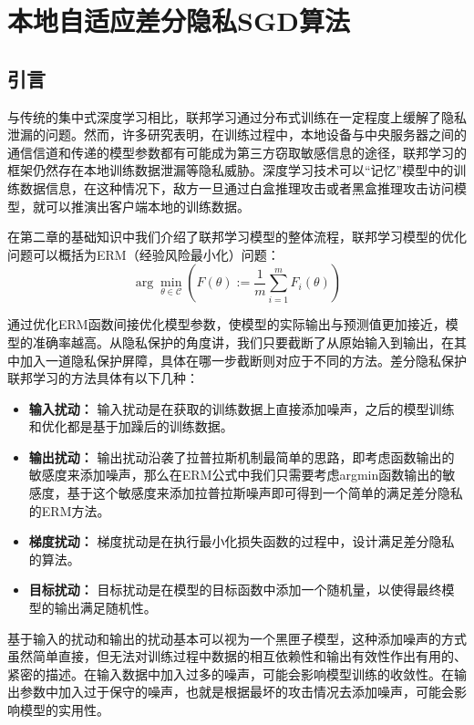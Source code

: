 \chapter{本地自适应差分隐私SGD算法}

\label{ch3}

\section{引言}
与传统的集中式深度学习相比，联邦学习通过分布式训练在一定程度上缓解了隐私泄漏的问题。然而，许多研究表明，在训练过程中，本地设备与中央服务器之间的通信信道和传递的模型参数都有可能成为第三方窃取敏感信息的途径，联邦学习的框架仍然存在本地训练数据泄漏等隐私威胁。深度学习技术可以“记忆”模型中的训练数据信息，在这种情况下，敌方一旦通过白盒推理攻击或者黑盒推理攻击访问模型，就可以推演出客户端本地的训练数据。

在第二章的基础知识中我们介绍了联邦学习模型的整体流程，联邦学习模型的优化问题可以概括为ERM（经验风险最小化）问题：
\begin{equation}\label{eq:ERM}
\arg \min _{\theta \in \mathcal{C}}\left(F(\theta):=\frac{1}{m} \sum_{i=1}^{m} F_{i}(\theta)\right)
\end{equation}

通过优化ERM函数间接优化模型参数，使模型的实际输出与预测值更加接近，模型的准确率越高。从隐私保护的角度讲，我们只要截断了从原始输入到输出，在其中加入一道隐私保护屏障，具体在哪一步截断则对应于不同的方法。差分隐私保护联邦学习的方法具体有以下几种：
\begin{itemize}
	\item \textbf{输入扰动：} 输入扰动是在获取的训练数据上直接添加噪声，之后的模型训练和优化都是基于加躁后的训练数据。
	\item \textbf{输出扰动：} 输出扰动沿袭了拉普拉斯机制最简单的思路，即考虑函数输出的敏感度来添加噪声，那么在ERM公式中我们只需要考虑argmin函数输出的敏感度，基于这个敏感度来添加拉普拉斯噪声即可得到一个简单的满足差分隐私的ERM方法。
	\item \textbf{梯度扰动：} 梯度扰动是在执行最小化损失函数的过程中，设计满足差分隐私的算法。
	\item \textbf{目标扰动：} 目标扰动是在模型的目标函数中添加一个随机量，以使得最终模型的输出满足随机性。
\end{itemize}

基于输入的扰动和输出的扰动基本可以视为一个黑匣子模型，这种添加噪声的方式虽然简单直接，但无法对训练过程中数据的相互依赖性和输出有效性作出有用的、紧密的描述。在输入数据中加入过多的噪声，可能会影响模型训练的收敛性。在输出参数中加入过于保守的噪声，也就是根据最坏的攻击情况去添加噪声，可能会影响模型的实用性。

